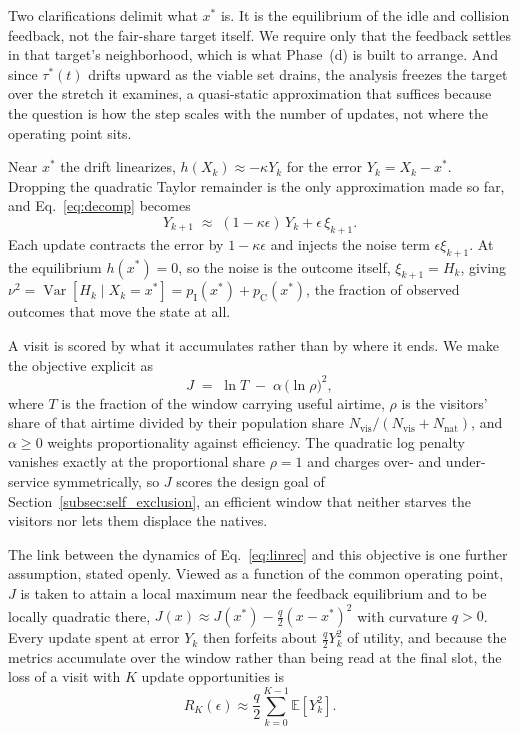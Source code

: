 \documentclass[journal,10pt]{IEEEtran}
\newcommand{\Nvis}{N_\mathrm{vis}}
\newcommand{\Nnat}{N_\mathrm{nat}}
\begin{document}
Two clarifications delimit what $x^*$ is. It is the equilibrium of the idle and collision feedback, not the fair-share target itself. We require only that the feedback settles in that target's neighborhood, which is what Phase~(d) is built to arrange. And since $\tau^*(t)$ drifts upward as the viable set drains, the analysis freezes the target over the stretch it examines, a quasi-static approximation that suffices because the question is how the step scales with the number of updates, not where the operating point sits.

Near $x^*$ the drift linearizes, $h(X_k)\approx-\kappa Y_k$ for the error $Y_k=X_k-x^*$. Dropping the quadratic Taylor remainder is the only approximation made so far, and Eq.~\eqref{eq:decomp} becomes
\begin{equation}
    Y_{k+1} \;\approx\; (1-\kappa\epsilon)\,Y_k + \epsilon\,\xi_{k+1}.
    \label{eq:linrec}
\end{equation}
Each update contracts the error by $1-\kappa\epsilon$ and injects the noise term $\epsilon\xi_{k+1}$. At the equilibrium $h(x^*)=0$, so the noise is the outcome itself, $\xi_{k+1}=H_k$, giving $\nu^2=\operatorname{Var}[H_k \mid X_k=x^*]=p_\mathrm{I}(x^*)+p_\mathrm{C}(x^*)$, the fraction of observed outcomes that move the state at all.

A visit is scored by what it accumulates rather than by where it ends. We make the objective explicit as
\begin{equation}
    J \;=\; \ln T \;-\; \alpha\,\bigl(\ln\rho\bigr)^{2},
    \label{eq:objective}
\end{equation}
where $T$ is the fraction of the window carrying useful airtime, $\rho$ is the visitors' share of that airtime divided by their population share $\Nvis/(\Nvis{+}\Nnat)$, and $\alpha\ge0$ weights proportionality against efficiency. The quadratic log penalty vanishes exactly at the proportional share $\rho=1$ and charges over- and under-service symmetrically, so $J$ scores the design goal of Section~\ref{subsec:self_exclusion}, an efficient window that neither starves the visitors nor lets them displace the natives. 

The link between the dynamics of Eq.~\eqref{eq:linrec} and this objective is one further assumption, stated openly. Viewed as a function of the common operating point, $J$ is taken to attain a local maximum near the feedback equilibrium and to be locally quadratic there, $J(x)\approx J(x^*)-\frac{q}{2}(x-x^*)^2$ with curvature $q>0$. Every update spent at error $Y_k$ then forfeits about $\frac{q}{2}Y_k^2$ of utility, and because the metrics accumulate over the window rather than being read at the final slot, the loss of a visit with $K$ update opportunities is 
\begin{equation}
    R_K(\epsilon)\approx\frac{q}{2}\sum_{k=0}^{K-1}\mathbb{E}[Y_k^2].
    \label{eq:regret_def}    
\end{equation}
\end{document}
